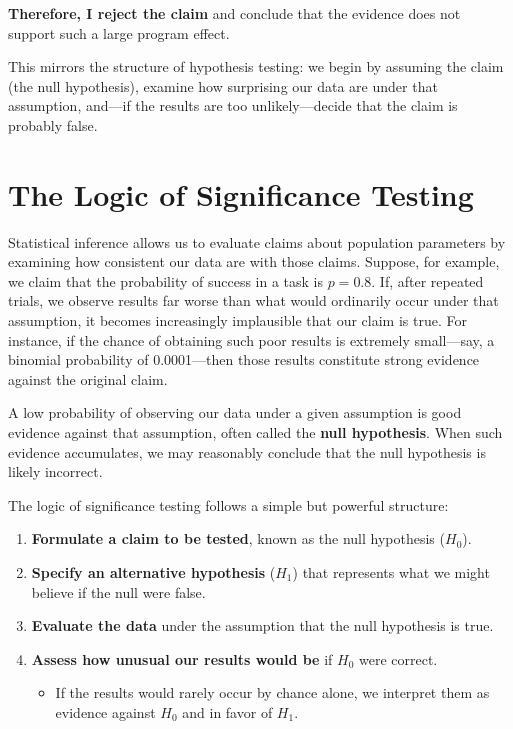 \documentclass[
  letterpaper,
  DIV=11,
  numbers=noendperiod]{scrreprt}
\providecommand{\tightlist}{%
  \setlength{\itemsep}{0pt}\setlength{\parskip}{0pt}}
\begin{document}
\textbf{Therefore, I reject the claim} and conclude that the evidence
does not support such a large program effect.

This mirrors the structure of hypothesis testing: we begin by assuming
the claim (the null hypothesis), examine how surprising our data are
under that assumption, and---if the results are too unlikely---decide
that the claim is probably false.

\section{The Logic of Significance
Testing}\label{the-logic-of-significance-testing}

Statistical inference allows us to evaluate claims about population
parameters by examining how consistent our data are with those claims.
Suppose, for example, we claim that the probability of success in a task
is \(p = 0.8\). If, after repeated trials, we observe results far worse
than what would ordinarily occur under that assumption, it becomes
increasingly implausible that our claim is true. For instance, if the
chance of obtaining such poor results is extremely small---say, a
binomial probability of 0.0001---then those results constitute strong
evidence against the original claim.

A low probability of observing our data under a given assumption is good
evidence against that assumption, often called the \textbf{null
hypothesis}. When such evidence accumulates, we may reasonably conclude
that the null hypothesis is likely incorrect.

The logic of significance testing follows a simple but powerful
structure:

\begin{enumerate}
\def\labelenumi{\arabic{enumi}.}
\item
  \textbf{Formulate a claim to be tested}, known as the null hypothesis
  (\(H_0\)).
\item
  \textbf{Specify an alternative hypothesis} (\(H_1\)) that represents
  what we might believe if the null were false.
\item
  \textbf{Evaluate the data} under the assumption that the null
  hypothesis is true.
\item
  \textbf{Assess how unusual our results would be} if \(H_0\) were
  correct.

  \begin{itemize}
  \tightlist
  \item
    If the results would rarely occur by chance alone, we interpret them
    as evidence against \(H_0\) and in favor of \(H_1\).
  \end{itemize}
\end{enumerate}
\end{document}
